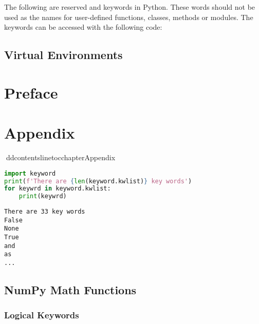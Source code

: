 

        The following are reserved and keywords in Python. These words should
not be used as the names for user-defined functions, classes, methods or
modules. The keywords can be accessed with the following code:



        \section{Virtual Environments}\label{virtual-environments}

                    \chapter{Preface}\label{preface}


                  \chapter*{Appendix}\label{appendix} 
 ddcontentsline{toc}{chapter}{Appendix}


        \begin{lstlisting}[language=Python]
import keyword
print(f'There are {len(keyword.kwlist)} key words')
for keywrd in keyword.kwlist:
    print(keywrd)
\end{lstlisting}

\begin{lstlisting}
There are 33 key words
False
None
True
and
as
...
\end{lstlisting}

    \section{NumPy Math Functions}\label{numpy-math-functions}




        \subsection{Logical Keywords}\label{logical-keywords}




